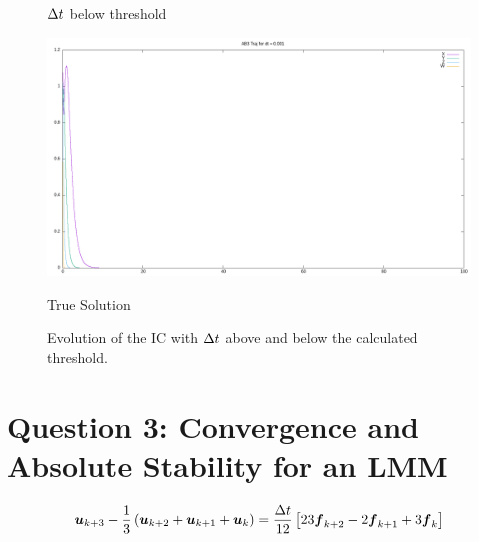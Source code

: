 \documentclass{article}
\begin{document}
\begin{enumerate}[label=\alph*)]
\begin{figure}[ht]
\begin{minipage}{0.48\textwidth}
            \caption*{$\Delta t$ below threshold}
        \end{minipage}
        
        \begin{minipage}{0.6\textwidth}
            \centering
            \includegraphics[width=1\textwidth]{rk3_act.png}
            \caption*{True Solution}
        \end{minipage}
        \caption{Evolution of the IC with $\Delta t$ above and below the calculated
        threshold.}
    \end{figure}

\end{enumerate}

\section*{Question 3: Convergence and Absolute Stability for an LMM}

\begin{align}
    \boldsymbol{u}_{k+3} - \frac{1}{3}\left(\boldsymbol{u}_{k+2}+\boldsymbol{u}_{k+1}+\boldsymbol{u}_{k}\right) =
    \frac{\Delta t}{12}\left[23\boldsymbol{f}_{k+2} -2\boldsymbol{f}_{k+1} + 3\boldsymbol{f}_{k}\right]
\end{align}
\end{document}
